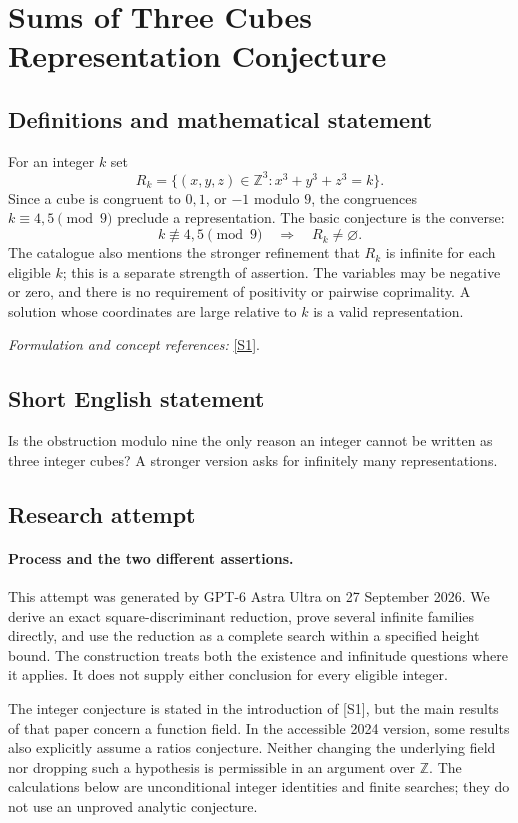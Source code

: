 \documentclass[11pt]{article}
\begin{document}
\section*{\texorpdfstring{Sums of Three Cubes Representation Conjecture}{Sums of Three Cubes Representation Conjecture}}\label{30006928}
\subsection{Definitions and mathematical statement}
For an integer $k$ set
\[
 R_k=\{(x,y,z)\in{\mathbb{Z}}^3:x^3+y^3+z^3=k\}.
\]
Since a cube is congruent to $0,1$, or $-1$ modulo $9$, the congruences $k\equiv4,5\pmod9$ preclude a representation. The basic conjecture is the converse:
\[
 k\not\equiv4,5\pmod9\quad\Longrightarrow\quad R_k\ne\varnothing.
\]
The catalogue also mentions the stronger refinement that $R_k$ is infinite for each eligible $k$; this is a separate strength of assertion. The variables may be negative or zero, and there is no requirement of positivity or pairwise coprimality. A solution whose coordinates are large relative to $k$ is a valid representation.
\par\smallskip\textit{Formulation and concept references:} \href{https://arxiv.org/pdf/2402.07146}{[S1]}.

\subsection{Short English statement}
Is the obstruction modulo nine the only reason an integer cannot be written as three integer cubes? A stronger version asks for infinitely many representations.
\subsection{Research attempt}
\paragraph{Process and the two different assertions.}
This attempt was generated by GPT-6 Astra Ultra on 27 September 2026. We derive an exact square-discriminant reduction, prove several infinite families directly, and use the reduction as a complete search within a specified height bound. The construction treats both the existence and infinitude questions where it applies. It does not supply either conclusion for every eligible integer.

The integer conjecture is stated in the introduction of [S1], but the main results of that paper concern a function field. In the accessible 2024 version, some results also explicitly assume a ratios conjecture. Neither changing the underlying field nor dropping such a hypothesis is permissible in an argument over $\mathbb Z$. The calculations below are unconditional integer identities and finite searches; they do not use an unproved analytic conjecture.
\end{document}
